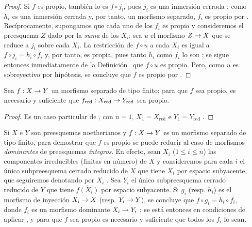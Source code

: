 \documentclass[oneside,10pt]{amsart}
\makeatletter
\renewcommand{\leq}{\leqslant}
\newcommand{\ega@arrow}[2]{\mathchoice{#1}{#2}{#2}{#2}}
\renewcommand{\to}{\ega@arrow{\longrightarrow}{\rightarrow}}
\newcommand{\oldpage}[2][]{\marginnote{\normalfont\footnotesize\textbf{#1}~|~#2}\ignorespaces}
\let\EGAOriginalLabel\label
\renewcommand{\label}[1]{\phantomsection\EGAOriginalLabel{#1}}
\makeatother
\begin{document}
\oldpage[II]{102}
\begin{proof}
Si $f$ es propio, también lo es $f\circ j_i$, pues $j_i$ es una inmersión cerrada ;
como $h_i$ es una inmersión cerrada y, por tanto, un morfismo separado, $f_i$ es propio por .
Recíprocamente, supongamos que cada uno de los $f_i$ es propio y consideremos el preesquema $Z$ dado por la \emph{suma} de los $X_i$; sea $u$ el morfismo $Z\to X$ que se reduce a $j_i$ sobre cada $X_i$.
La restricción de $f\circ u$ a cada $X_i$ es igual a $f\circ j_i=h_i\circ f_i$ y, por tanto, es propia, pues tanto $h_i$ como $f_i$ lo son ;
se sigue entonces inmediatamente de la Definición~ que $f\circ u$ es propio.
Pero, como $u$ es sobreyectivo por hipótesis, se concluye que $f$ es propio por .
\end{proof}

\begin{corollary}[5.4.6]
\label{II.5.4.6-fr}
Sea $f:X\to Y$ un morfismo separado de tipo finito; para que $f$ sea propio, es necesario y suficiente que $f_{\mathrm{red}}:X_{\mathrm{red}}\to Y_{\mathrm{red}}$ sea propio.
\end{corollary}

\begin{proof}
Es un caso particular de , con $n=1$, $X_1=X_{\mathrm{red}}$ e $Y_1=Y_{\mathrm{red}}$ .
\end{proof}

\begin{env}[5.4.7]
\label{II.5.4.7-fr}
Si $X$ e $Y$ son preesquemas noetherianos y $f:X\to Y$ es un morfismo separado de tipo finito, para demostrar que $f$ es propio se puede reducir al caso de morfismos \emph{dominantes} de preesquemas \emph{íntegros}.
En efecto, sean $X_i$ ($1\leq i\leq n$) las componentes irreducibles (finitas en número) de $X$ y consideremos para cada $i$ el único subpreesquema cerrado reducido de $X$ que tiene $X_i$ por espacio subyacente, que seguiremos denotando por $X_i$ .
Sea $Y_i$ el único subpreesquema cerrado reducido de $Y$ que tiene $\overline{f(X_i)}$ por espacio subyacente.
Si $g_i$ (resp. $h_i$) es el morfismo de inyección $X_i\to X$ (resp. $Y_i\to Y$), se concluye que $f\circ g_i=h_i\circ f_i$, donde $f_i$ es un morfismo dominante $X_i\to Y_i$ ;
se está entonces en condiciones de aplicar , y para que $f$ sea propio es necesario y suficiente que todos los $f_i$ lo sean.
\end{env}
\end{document}
